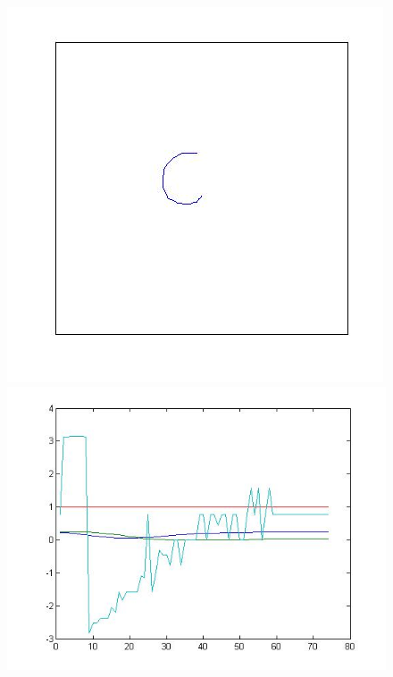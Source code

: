 \begin{figure}[H]
	\centering
	\begin{minipage}{.5\textwidth}
		\centering
		\includegraphics[width=.99\linewidth]{images/cSmall}
	\end{minipage}%
	\begin{minipage}{.5\textwidth}
		\centering
		\includegraphics[width=.99\linewidth]{images/cSmallPlot}
	\end{minipage}
\end{figure}
